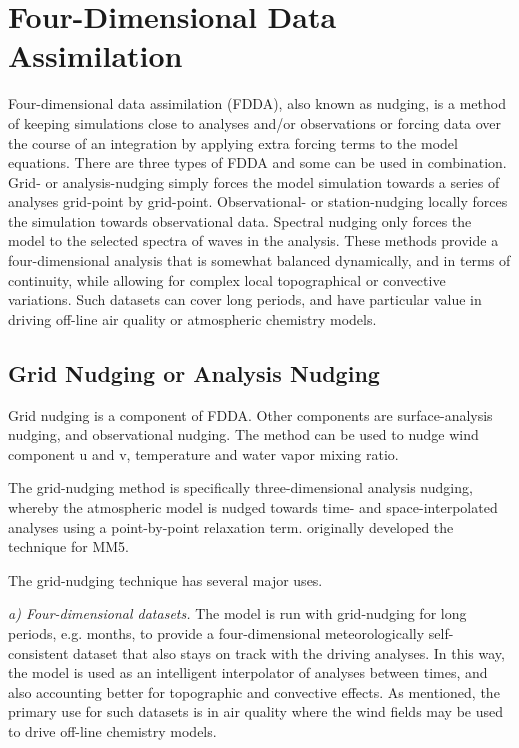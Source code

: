 \chapter{Four-Dimensional Data Assimilation}
\label{fdda_chap}

Four-dimensional data assimilation (FDDA), also known as nudging, is a method of keeping
simulations close to analyses and/or observations or forcing data over the course of an
integration by applying extra forcing terms to the model equations.
There are three types of FDDA and some can be used in
combination. Grid- or analysis-nudging simply forces the model simulation 
towards a series of analyses grid-point by grid-point. Observational- or station-nudging
locally forces the simulation towards observational data. 
Spectral nudging only forces the model to the selected spectra of waves in the analysis.
These methods provide a four-dimensional analysis that is somewhat balanced dynamically,
and in terms of continuity,
while allowing for complex local topographical or convective variations.
Such datasets can cover long periods, and have particular value in driving
off-line air quality or atmospheric chemistry models.

\section{Grid Nudging or Analysis Nudging}

Grid nudging is a component of FDDA. Other components are surface-analysis nudging, and observational nudging. The method can be used to nudge wind component u and v, temperature and water vapor mixing ratio.

The grid-nudging method is specifically three-dimensional analysis nudging, whereby the atmospheric model is nudged towards time- and space-interpolated analyses using a point-by-point relaxation term. \citet{stauffer90} originally developed the technique for MM5.

The grid-nudging technique has several major uses.

{\it a) Four-dimensional datasets.} The model is run with grid-nudging for long periods, e.g. months, to provide a four-dimensional meteorologically self-consistent dataset that also stays on track with the driving analyses. In this way, the model is used as an intelligent interpolator of analyses between times, and also accounting better for topographic and convective effects. As mentioned, the primary use for such datasets is in air quality where the wind fields may be used to drive off-line chemistry models.


